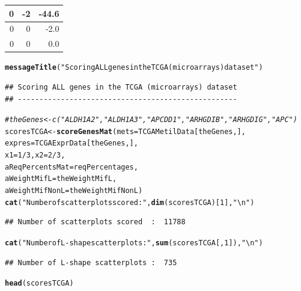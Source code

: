 \documentclass[a4paper,10pt]{article}\usepackage[]{graphicx}\usepackage[]{color}
\makeatletter
\newcommand{\hlnum}[1]{\textcolor[rgb]{0.686,0.059,0.569}{#1}}%
\newcommand{\hlstr}[1]{\textcolor[rgb]{0.192,0.494,0.8}{#1}}%
\newcommand{\hlcom}[1]{\textcolor[rgb]{0.678,0.584,0.686}{\textit{#1}}}%
\newcommand{\hlopt}[1]{\textcolor[rgb]{0,0,0}{#1}}%
\newcommand{\hlstd}[1]{\textcolor[rgb]{0.345,0.345,0.345}{#1}}%
\newcommand{\hlkwb}[1]{\textcolor[rgb]{0.69,0.353,0.396}{#1}}%
\newcommand{\hlkwc}[1]{\textcolor[rgb]{0.333,0.667,0.333}{#1}}%
\newcommand{\hlkwd}[1]{\textcolor[rgb]{0.737,0.353,0.396}{\textbf{#1}}}%
\newenvironment{kframe}{%
 \def\at@end@of@kframe{}%
 \ifinner\ifhmode%
  \def\at@end@of@kframe{\end{minipage}}%
  \begin{minipage}{\columnwidth}%
 \fi\fi%
 \def\FrameCommand##1{\hskip\@totalleftmargin \hskip-\fboxsep
 \colorbox{shadecolor}{##1}\hskip-\fboxsep
     \hskip-\linewidth \hskip-\@totalleftmargin \hskip\columnwidth}%
 \MakeFramed {\advance\hsize-\width
   \@totalleftmargin\z@ \linewidth\hsize
   \@setminipage}}%
 {\par\unskip\endMakeFramed%
 \at@end@of@kframe}
\newenvironment{knitrout}{}{} %
\makeatother
\begin{document}
\begin{knitrout}
\begin{tabular}{r|r|r}
\hline
0 & -2 & -44.6\\
\hline
0 & 0 & -2.0\\
\hline
0 & 0 & 0.0\\
\hline
\end{tabular}\begin{kframe}\begin{alltt}
 \hlkwd{messageTitle}\hlstd{(}\hlstr{"Scoring ALL genes in the TCGA (microarrays) dataset"}\hlstd{)}
\end{alltt}
\begin{verbatim}
## Scoring ALL genes in the TCGA (microarrays) dataset 
## ---------------------------------------------------
\end{verbatim}
\begin{alltt}
\hlcom{# theGenes <- c("ALDH1A2", "ALDH1A3", "APCDD1", "ARHGDIB", "ARHGDIG", "APC")}
\hlstd{scoresTCGA} \hlkwb{<-} \hlkwd{scoreGenesMat} \hlstd{(}\hlkwc{mets}\hlstd{=TCGAMetilData[theGenes,],}
                                                                      \hlkwc{expres}\hlstd{=TCGAExprData[theGenes,],}
                                                                       \hlkwc{x1}\hlstd{=}\hlnum{1}\hlopt{/}\hlnum{3}\hlstd{,} \hlkwc{x2}\hlstd{=}\hlnum{2}\hlopt{/}\hlnum{3}\hlstd{,}
                            \hlkwc{aReqPercentsMat}\hlstd{=reqPercentages,}
                            \hlkwc{aWeightMifL}\hlstd{=theWeightMifL,}
                            \hlkwc{aWeightMifNonL}\hlstd{=theWeightMifNonL )}
\hlkwd{cat}\hlstd{(}\hlstr{"Number of scatterplots scored  : "}\hlstd{,} \hlkwd{dim}\hlstd{(scoresTCGA)[}\hlnum{1}\hlstd{],}\hlstr{"\textbackslash{}n"}\hlstd{)}
\end{alltt}
\begin{verbatim}
## Number of scatterplots scored  :  11788
\end{verbatim}
\begin{alltt}
\hlkwd{cat}\hlstd{(}\hlstr{"Number of L-shape scatterplots : "}\hlstd{,} \hlkwd{sum}\hlstd{(scoresTCGA[,}\hlnum{1}\hlstd{]),}\hlstr{"\textbackslash{}n"}\hlstd{)}
\end{alltt}
\begin{verbatim}
## Number of L-shape scatterplots :  735
\end{verbatim}
\begin{alltt}
\hlkwd{head}\hlstd{(scoresTCGA)}
\end{alltt}
\end{kframe}



\end{knitrout}
\end{document}
